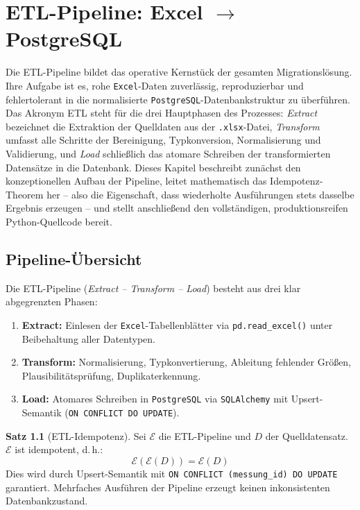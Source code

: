 ﻿\documentclass[12pt,a4paper]{report}
\theoremstyle{definition}
\newtheorem{theorem}{Satz}[section]
\theoremstyle{remark}
\newcommand{\excel}{\texttt{Excel}}
\newcommand{\pg}{\texttt{PostgreSQL}}
\newcommand{\sqlalchemy}{\texttt{SQLAlchemy}}
\newcommand{\code}[1]{\texttt{#1}}
\begin{document}
\chapter{ETL-Pipeline: Excel \texorpdfstring{$\to$}{->} PostgreSQL}

Die ETL-Pipeline bildet das operative Kernstück der gesamten Migrationslösung. Ihre Aufgabe ist es, rohe \excel{}-Daten zuverlässig, reproduzierbar und fehlertolerant in die normalisierte \pg{}-Datenbankstruktur zu überführen. Das Akronym ETL steht für die drei Hauptphasen des Prozesses: \textit{Extract} bezeichnet die Extraktion der Quelldaten aus der \code{.xlsx}-Datei, \textit{Transform} umfasst alle Schritte der Bereinigung, Typkonversion, Normalisierung und Validierung, und \textit{Load} schließlich das atomare Schreiben der transformierten Datensätze in die Datenbank. Dieses Kapitel beschreibt zunächst den konzeptionellen Aufbau der Pipeline, leitet mathematisch das Idempotenz-Theorem her -- also die Eigenschaft, dass wiederholte Ausführungen stets dasselbe Ergebnis erzeugen -- und stellt anschließend den vollständigen, produktionsreifen Python-Quellcode bereit.

\section{Pipeline-Übersicht}
Die ETL-Pipeline (\textit{Extract -- Transform -- Load}) besteht aus
drei klar abgegrenzten Phasen:

\begin{enumerate}[leftmargin=1.5em]
  \item \textbf{Extract:} Einlesen der \excel-Tabellenblätter via
        \code{pd.read\_excel()} unter Beibehaltung aller Datentypen.
  \item \textbf{Transform:} Normalisierung, Typkonvertierung, Ableitung
        fehlender Gr\"o\ss{}en, Plausibilitätsprüfung, Duplikaterkennung.
  \item \textbf{Load:} Atomares Schreiben in \pg{} via \sqlalchemy{}
        mit Upsert-Semantik (\code{ON CONFLICT DO UPDATE}).
\end{enumerate}

\begin{theorem}[ETL-Idempotenz]
  Sei $\mathcal{E}$ die ETL-Pipeline und $D$ der Quelldatensatz.
  $\mathcal{E}$ ist idempotent, d.\,h.:
  \[
    \mathcal{E}(\mathcal{E}(D)) = \mathcal{E}(D)
  \]
  Dies wird durch Upsert-Semantik mit \code{ON CONFLICT (messung\_id)
  DO UPDATE} garantiert. Mehrfaches Ausführen der Pipeline erzeugt
  keinen inkonsistenten Datenbankzustand.
\end{theorem}
\end{document}

